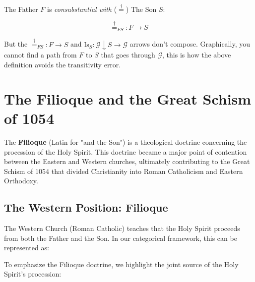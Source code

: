 \documentclass[11pt]{article}
\begin{document}
The Father $F$ is \emph{consubstantial with} ($\stackrel{\dagger}{=}$) The Son $S$:

$$\stackrel{\dagger}{=}_{FS} : F \to S$$

But the $\stackrel{\dagger}{=}_{FS} : F \to S$ and $\text{Is}_S : \mathcal{G}\downarrow S \to \mathcal{G}$ arrows don't compose. Graphically, you cannot find a path from $F$ to $S$ that goes through $\mathcal{G}$, this is how the above definition avoids the transitivity error.

\section{The Filioque and the Great Schism of 1054}
\label{sec:filioque}

The \textbf{Filioque} (Latin for "and the Son") is a theological doctrine concerning the procession of the Holy Spirit. This doctrine became a major point of contention between the Eastern and Western churches, ultimately contributing to the Great Schism of 1054 that divided Christianity into Roman Catholicism and Eastern Orthodoxy.

\subsection{The Western Position: Filioque}
\label{sec:western-filioque}

The Western Church (Roman Catholic) teaches that the Holy Spirit proceeds from both the Father and the Son. In our categorical framework, this can be represented as:

\begin{center}
\end{center}

\vspace{1em}

To emphasize the Filioque doctrine, we highlight the joint source of the Holy Spirit's procession:

\begin{center}
\end{center}
\end{document}
